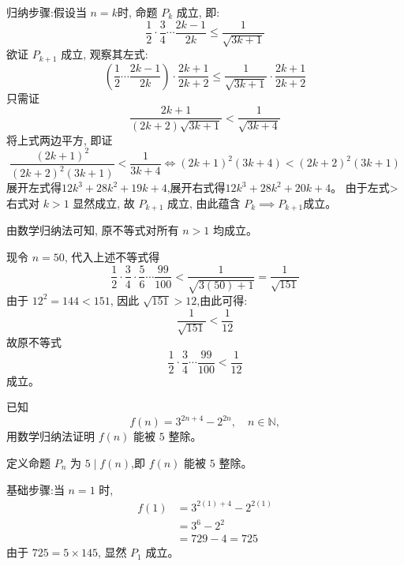 \begin{questions}
\begin{solution}
        归纳步骤:假设当 $n = k$时, 命题 $P_k$ 成立, 即:
        \[ 
        \frac{1}{2} \cdot \frac{3}{4} \cdots \frac{2k - 1}{2k} \le \frac{1}{\sqrt{3k + 1}} 
        \]
        欲证 $P_{k+1}$ 成立, 观察其左式:
        \[ 
        \left( \frac{1}{2} \cdots \frac{2k - 1}{2k} \right) \cdot \frac{2k + 1}{2k + 2} \le \frac{1}{\sqrt{3k + 1}} \cdot \frac{2k + 1}{2k + 2} 
        \]
        只需证
        \[ 
        \frac{2k + 1}{(2k + 2)\sqrt{3k + 1}} < \frac{1}{\sqrt{3k + 4}} 
        \]
        将上式两边平方, 即证
        \[ 
        \frac{(2k + 1)^2}{(2k + 2)^2(3k + 1)} < \frac{1}{3k + 4} \iff (2k + 1)^2 (3k + 4) < (2k + 2)^2 (3k + 1)
        \]
        展开左式得$12k^3 + 28k^2 + 19k + 4$,展开右式得$12k^3 + 28k^2 + 20k + 4$。
        由于左式>右式对 $k > 1$ 显然成立, 故 $P_{k+1}$ 成立, 由此蕴含 $P_k \implies P_{k+1}$成立。
        
        由数学归纳法可知, 原不等式对所有 $n > 1$ 均成立。

        现令 $n = 50$, 代入上述不等式得
        \[
        \frac{1}{2} \cdot \frac{3}{4} \cdot \frac{5}{6} \cdots \frac{99}{100} < \frac{1}{\sqrt{3(50) + 1}} = \frac{1}{\sqrt{151}}
        \]
        由于 $12^2 = 144 < 151$, 因此 $\sqrt{151} > 12$,由此可得:
        \[
        \frac{1}{\sqrt{151}} < \frac{1}{12}
        \]
        故原不等式 
        \[
        \frac{1}{2} \cdot \frac{3}{4} \cdots \frac{99}{100} < \frac{1}{12}
        \]
        成立。
    \end{solution}

    \question 已知
    \[
    f(n)=3^{2n+4}-2^{2n},\quad n\in\mathbb{N},
    \]
    用数学归纳法证明 $f(n)$ 能被 $5$ 整除。
    \begin{solution}
        定义命题 $P_n$ 为 $5 \mid f(n)$,即 $f(n)$ 能被 $5$ 整除。

        基础步骤:当 $n=1$ 时,
        \begin{align}
        f(1) &= 3^{2(1)+4}-2^{2(1)} \\
        &= 3^6-2^2 \\
        &= 729-4 = 725
        \end{align}
        由于 $725 = 5 \times 145$, 显然 $P_1$ 成立。


\end{solution}
\end{questions}
